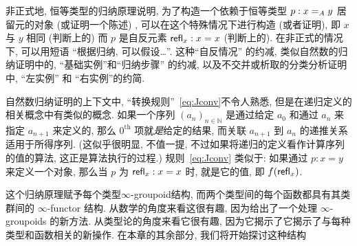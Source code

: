 非正式地, 恒等类型的归纳原理说明, 为了构造一个依赖于恒等类型 $p:\id[A]xy$ 居留元的对象 (或证明一个陈述) , 可以在这个特殊情况下进行构造 (或者证明), 即 $x$ 与 $y$ 相同 (判断上的) 而 $p$ 是自反元素 $\refl{x}:x=x$ (判断上的). 在非正式的情况下, 可以用短语 ``根据归纳, 可以假设\dots''. 这种``自反情况'' 的约减, 类似自然数的归纳证明中的, ``基础实例''和``归纳步骤'' 的约减, 以及不交并或析取的分类分析证明中, ``左实例'' 和 ``右实例''的约简. %


自然数归纳证明的上下文中, ``转换规则''~\eqref{eq:Jconv}不令人熟悉, 但是在递归定义的相关概念中有类似的概念. 如果一个序列 $(a_n)_{n\in \mathbb{N}}$ 是通过给定 $a_0$ 和通过 $a_n$ 来指定 $a_{n+1}$ 来定义的, 那么 $0^{\mathrm{th}}$ 项就\emph{是}给定的结果, 而关联 $a_{n+1}$ 到 $a_n$ 的递推关系适用于所得序列. (这似乎很明显, 不值一提, 不过如果将递归的定义看作计算序列的值的算法, 这正是算法执行的过程.) 规则~\eqref{eq:Jconv} 类似于: 如果通过 $p:x=y$ 来定义一个对象, 那么当 $p$ 为 $\refl{x}:x=x$ 时, 就是它的值, 即 $f(\refl{x})$. 

这个归纳原理赋予每个类型$\infty$-groupoid结构, 而两个类型间的每个函数都具有其类群间的 $\infty$-functor 结构. 从数学的角度来看这很有趣, 因为给出了一个处理 $\infty$-groupoids 的新方法. 从类型论的角度来看它很有趣, 因为它揭示了它揭示了与每种类型和函数相关的新操作. 在本章的其余部分, 我们将开始探讨这种结构 